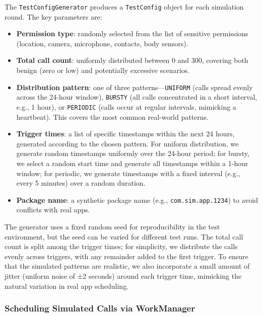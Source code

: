 The \texttt{TestConfigGenerator} produces a \texttt{TestConfig} object for each simulation round. The key parameters are:
\begin{itemize}
\item \textbf{Permission type}: randomly selected from the list of sensitive permissions (location, camera, microphone, contacts, body sensors).
\item \textbf{Total call count}: uniformly distributed between 0 and 300, covering both benign (zero or low) and potentially excessive scenarios.
\item \textbf{Distribution pattern}: one of three patterns—\texttt{UNIFORM} (calls spread evenly across the 24-hour window), \texttt{BURSTY} (all calls concentrated in a short interval, e.g., 1 hour), or \texttt{PERIODIC} (calls occur at regular intervals, mimicking a heartbeat). This covers the most common real-world patterns.
\item \textbf{Trigger times}: a list of specific timestamps within the next 24 hours, generated according to the chosen pattern. For uniform distribution, we generate random timestamps uniformly over the 24-hour period; for bursty, we select a random start time and generate all timestamps within a 1-hour window; for periodic, we generate timestamps with a fixed interval (e.g., every 5 minutes) over a random duration.
\item \textbf{Package name}: a synthetic package name (e.g., \texttt{com.sim.app.1234}) to avoid conflicts with real apps.
\end{itemize}

The generator uses a fixed random seed for reproducibility in the test environment, but the seed can be varied for different test runs. The total call count is split among the trigger times; for simplicity, we distribute the calls evenly across triggers, with any remainder added to the first trigger. To ensure that the simulated patterns are realistic, we also incorporate a small amount of jitter (uniform noise of ±2 seconds) around each trigger time, mimicking the natural variation in real app scheduling.

\subsubsection{Scheduling Simulated Calls via WorkManager}

